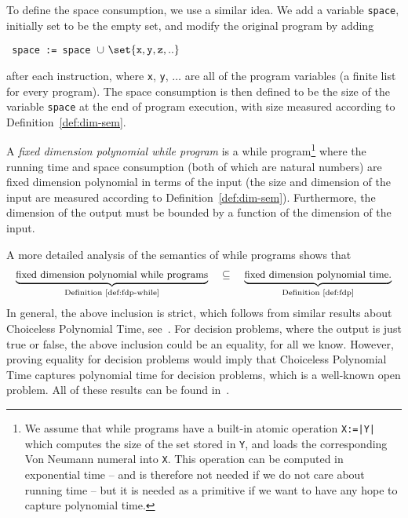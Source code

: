 To define the space consumption, we use a similar idea. We add a variable {\tt space}, initially set to be the empty set, and modify the original program by adding 
\begin{center}
 \tt{ space := space }$\cup\ \set{\mathtt{x, y, z, ..}}$
\end{center}
after each instruction, where {\tt x}, {\tt y}, $\ldots$ are all of the program variables (a finite list for every program). The space consumption is then defined to be the size of the variable {\tt space} at the end of program execution, with size measured according to Definition~\ref{def:dim-sem}.

\begin{definition}\label{def:fdp-while}
 A \emph{fixed dimension polynomial while program} is a while program\footnote{We assume that while programs have a built-in atomic operation {\tt X:=|Y|}
 which computes the size of the set stored in {\tt Y}, and loads the corresponding Von Neumann numeral into {\tt X}. This operation can be computed in exponential time -- and is therefore not needed if we do not care about running time -- but it is needed as a primitive if we want to have any hope to capture polynomial time. } where the running time and space consumption (both of which are natural numbers) are fixed dimension polynomial in terms of the input (the size and dimension of the input are measured according to Definition~\ref{def:dim-sem}). Furthermore, the dimension of the output must be bounded by a function of the dimension of the input. 
\end{definition}
 A more detailed analysis of the semantics of while programs shows that
 \begin{align*}
 \underbrace{\text{\small fixed dimension polynomial while programs}}_{\text{Definition~\ref{def:fdp-while}}} \quad \subseteq \quad \underbrace{\text{\small fixed dimension polynomial time.}}_{\text{Definition~\ref{def:fdp}}}
 \end{align*}
 In general, the above inclusion is strict, which follows from similar results about Choiceless Polynomial Time, see~\cite[Section 6]{rossman_choiceless_2010}. 
 For decision problems, where the output is just true or false, the above inclusion could be an equality, for all we know. However, proving equality for decision problems would imply that Choiceless Polynomial Time captures polynomial time for decision problems, which is a well-known open problem. All of these results can be found in~\cite{bojanczyk_computability_2018}.



